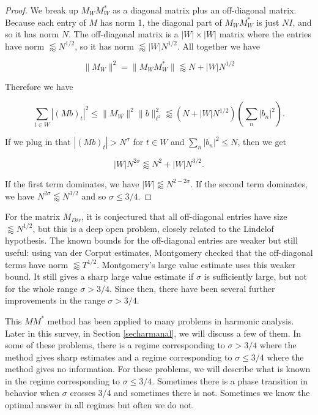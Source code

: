 \documentclass{amsart}
\begin{document}
\begin{proof}  We break up $M_W M_W^*$ as a diagonal matrix plus an off-diagonal matrix.   Because each entry of $M$ has norm 1,  the diagonal part of $M_W M_W^*$ is just $N I$, and so it has norm $N$.   The off-diagonal matrix is a $|W| \times |W|$ matrix where the entries have norm $\lessapprox N^{1/2}$,  so it has norm $\lessapprox |W| N^{1/2}$.   All together we have

\begin{equation} \label{MWnorm}
\| M_W \|^2 = \| M_W M_W^* \| \lessapprox N + |W| N^{1/2}
\end{equation}

Therefore we have

$$ \sum_{t \in W} | (Mb)_t |^2 \le \| M_W \|^2 \|b \|_{\ell^2}^2 \lessapprox ( N + |W| N^{1/2} ) (\sum_n |b_n|^2 ). $$

If we plug in that $ | (Mb)_t | > N^\sigma$ for $t \in W$ and $\sum_n |b_n|^2 \le N$,  then we get

$$ |W| N^{2 \sigma} \lessapprox N^2 + |W| N^{3/2}. $$

If the first term dominates,  we have $|W| \lessapprox N^{2 - 2 \sigma}$.   If the second term dominates,  we have $N^{2 \sigma} \lessapprox N^{3/2}$ and so $\sigma \le 3/4$.  

\end{proof}

For the matrix $M_{Dir}$,  it is conjectured that all off-diagonal entries have size $\lessapprox N^{1/2}$,  but this is a deep open problem,  closely related to the Lindelof hypothesis.   The known bounds for the off-diagonal entries are weaker but still useful: using van der Corput estimates, Montgomery checked that the off-diagonal terms have norm $\lessapprox T^{1/2}$.   Montgomery's large value estimate uses this weaker bound.   It still gives a sharp large value estimate if $\sigma$ is sufficiently large,  but not for the whole range $\sigma > 3/4$.   Since then,  there have been several further improvements in the range $\sigma > 3/4$.   

This $M M^*$ method has been applied to many problems in harmonic analysis.  Later in this survey,  in Section \ref{secharmanal},
we will discuss a few of them.   In some of these problems,  there is a regime corresponding to $\sigma > 3/4$ where the method gives sharp estimates and a regime corresponding to $\sigma \le 3/4$ where the method gives no information.    For these problems,  we will describe what is known in the regime corresponding to $\sigma \le 3/4$.   Sometimes there is a phase transition in behavior when $\sigma$ crosses 3/4 and sometimes there is not.   Sometimes we know the optimal answer in all regimes but often we do not.
\end{document}

